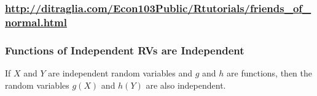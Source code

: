 \documentclass[handout]{beamer}
\begin{document}
\begin{frame}
	\frametitle{\normalsize \href{http://ditraglia.com/Econ103Public/Rtutorials/friends_of_normal.html}{http://ditraglia.com/Econ103Public/Rtutorials/friends\_of\_normal.html}}



\begin{figure}
\end{figure}

\end{frame}


\begin{frame}
\frametitle{Functions of Independent RVs are Independent}

If $X$ and $Y$ are independent random variables and $g$ and $h$ are functions, then the random variables $g(X)$ and $h(Y)$ are also independent.

\end{frame}
\end{document}
